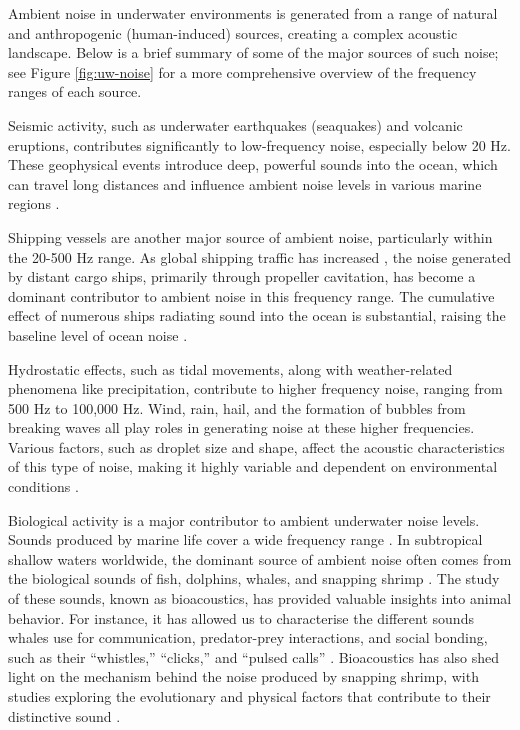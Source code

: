 Ambient noise in underwater environments is generated from a range of natural and anthropogenic (human-induced) sources, creating a complex acoustic landscape. Below is a brief summary of some of the major sources of such noise; see Figure \ref{fig:uw-noise} for a more comprehensive overview of the frequency ranges of each source.

Seismic activity, such as underwater earthquakes (seaquakes) and volcanic eruptions, contributes significantly to low-frequency noise, especially below 20 Hz. These geophysical events introduce deep, powerful sounds into the ocean, which can travel long distances and influence ambient noise levels in various marine regions \cite{knowlton_what_nodate}.

Shipping vessels are another major source of ambient noise, particularly within the 20-500 Hz range. As global shipping traffic has increased \cite{andrew_ocean_2002}, the noise generated by distant cargo ships, primarily through propeller cavitation, has become a dominant contributor to ambient noise in this frequency range. The cumulative effect of numerous ships radiating sound into the ocean is substantial, raising the baseline level of ocean noise \cite{ross_mechanics_1976}.

Hydrostatic effects, such as tidal movements, along with weather-related phenomena like precipitation, contribute to higher frequency noise, ranging from 500 Hz to 100,000 Hz. Wind, rain, hail, and the formation of bubbles from breaking waves all play roles in generating noise at these higher frequencies. Various factors, such as droplet size and shape, affect the acoustic characteristics of this type of noise, making it highly variable and dependent on environmental conditions \cite{medwin_bubble_1989, franz_splashes_1959, dahl_underwater_2007}.

Biological activity is a major contributor to ambient underwater noise levels. Sounds produced by marine life cover a wide frequency range \cite{bjorno_applied_2017}. In subtropical shallow waters worldwide, the dominant source of ambient noise often comes from the biological sounds of fish, dolphins, whales, and snapping shrimp \cite{cato_ultrasonic_1992}. The study of these sounds, known as bioacoustics, has provided valuable insights into animal behavior. For instance, it has allowed us to characterise the different sounds whales use for communication, predator-prey interactions, and social bonding, such as their ``whistles,'' ``clicks,'' and ``pulsed calls'' \cite{richardson_marine_1995}. Bioacoustics has also shed light on the mechanism behind the noise produced by snapping shrimp, with studies exploring the evolutionary and physical factors that contribute to their distinctive sound \cite{patek_evolutionary_2018, lohse_snapping_2001, ritzmann_snapping_1973}.

